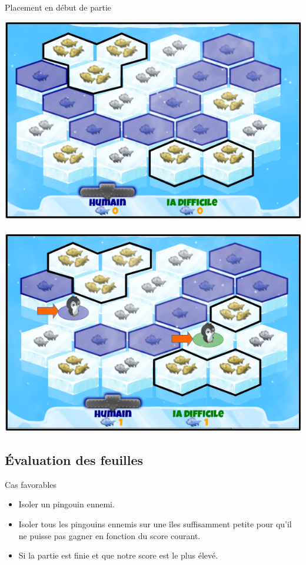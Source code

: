 \documentclass{beamer}
\begin{document}
\begin{frame}{Placement en début de partie}
\begin{center}
 \includegraphics[scale=0.22]{IA1}\hspace*{0.5cm}~%
 \pause
 \includegraphics[scale=0.22]{IA2}
\end{center}
\end{frame}



\subsection{Évaluation des feuilles}

\begin{frame}{}
\begin{block}{Cas favorables}
\begin{itemize}
 \item<1-> Isoler un pingouin ennemi.
 \item<2-> Isoler tous les pingouins ennemis sur une îles suffisamment petite pour qu'il ne puisse pas gagner en fonction du score courant.
 \item<3-> Si la partie est finie et que notre score est le plus élevé.
\end{itemize}
\end{block}
\end{frame}
\end{document}
